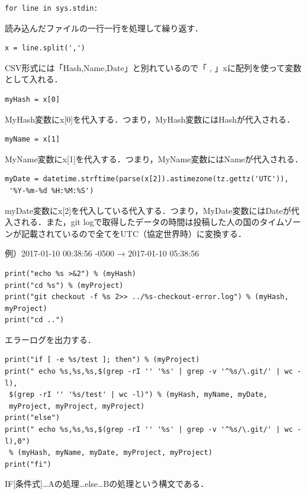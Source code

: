 \hfil
\begin{lstlisting}[basicstyle=\ttfamily\footnotesize, frame=single]
for line in sys.stdin:
\end{lstlisting}
読み込んだファイルの一行一行を処理して繰り返す．

\hfil
\begin{lstlisting}[basicstyle=\ttfamily\footnotesize, frame=single]
x = line.split(',')
\end{lstlisting}
CSV形式には「Hash,Name,Date」と別れているので「 , 」xに配列を使って変数として入れる．

\hfil
\begin{lstlisting}[basicstyle=\ttfamily\footnotesize, frame=single]
myHash = x[0]
\end{lstlisting}
MyHash変数にx[0]を代入する．つまり，MyHash変数にはHashが代入される．

\hfil
\begin{lstlisting}[basicstyle=\ttfamily\footnotesize, frame=single]
myName = x[1]
\end{lstlisting}
MyName変数にx[1]を代入する．つまり，MyName変数にはNameが代入される．

\hfil
\begin{lstlisting}[basicstyle=\ttfamily\footnotesize, frame=single]
myDate = datetime.strftime(parse(x[2]).astimezone(tz.gettz('UTC')),
 '%Y-%m-%d %H:%M:%S')
\end{lstlisting}
myDate変数にx[2]を代入している代入する．つまり，MyDate変数にはDateが代入される．また，git logで取得したデータの時間は投稿した人の国のタイムゾーンが記載されているので全てをUTC（協定世界時）に変換する．

例）2017-01-10 00:38:56 -0500 → 2017-01-10 05:38:56

\hfil
\begin{lstlisting}[basicstyle=\ttfamily\footnotesize, frame=single]
print("echo %s >&2") % (myHash)
print("cd %s") % (myProject)
print("git checkout -f %s 2>> ../%s-checkout-error.log") % (myHash, myProject)
print("cd ..")
\end{lstlisting}
エラーログを出力する．

\hfil
\begin{lstlisting}[basicstyle=\ttfamily\footnotesize, frame=single]
print("if [ -e %s/test ]; then") % (myProject)
print(" echo %s,%s,%s,$(grep -rI '' '%s' | grep -v '^%s/\.git/' | wc -l),
 $(grep -rI '' '%s/test' | wc -l)") % (myHash, myName, myDate,
 myProject, myProject, myProject)
print("else")
print(" echo %s,%s,%s,$(grep -rI '' '%s' | grep -v '^%s/\.git/' | wc -l),0")
 % (myHash, myName, myDate, myProject, myProject)
print("fi")
\end{lstlisting}
IF[条件式]…Aの処理…else…Bの処理という構文である．

